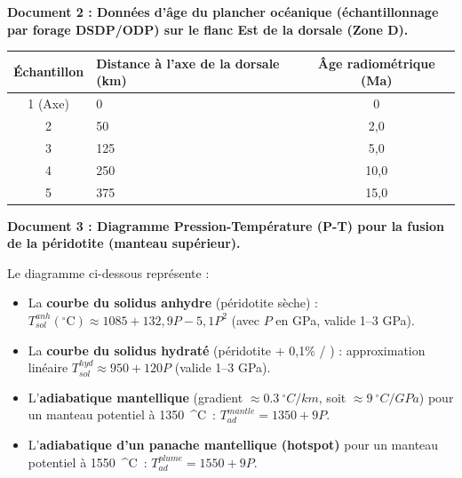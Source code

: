\documentclass[11pt]{article}
\begin{document}
\par
\textbf{Document 2 : Données d'âge du plancher océanique (échantillonnage par forage DSDP/ODP) sur le flanc Est de la dorsale (Zone D).}
\begin{center}
\begin{tabularx}{\linewidth}{|c|X|c|}\hline
\textbf{Échantillon} & \textbf{Distance à l'axe de la dorsale (km)} & \textbf{Âge radiométrique (Ma)} \\ \hline
1 (Axe) & 0 & 0 \\ \hline
2 & 50 & 2,0 \\ \hline
3 & 125 & 5,0 \\ \hline
4 & 250 & 10,0 \\ \hline
5 & 375 & 15,0 \\ \hline
\end{tabularx}
\end{center}

\par
\textbf{Document 3 : Diagramme Pression-Température (P-T) pour la fusion de la péridotite (manteau supérieur).}
\par
Le diagramme ci-dessous représente :
\begin{itemize}
    \item La \textbf{courbe du solidus anhydre} (péridotite sèche) : $T_{sol}^{anh} (^\circ\mathrm{C}) \approx 1085 + 132,9 P - 5,1 P^2$ (avec $P$ en GPa, valide 1--3 GPa).
    \item La \textbf{courbe du solidus hydraté} (péridotite + 0,1\%  / ) : approximation linéaire $T_{sol}^{hyd} \approx 950 + 120 P$ (valide 1--3 GPa).
    \item L'\textbf{adiabatique mantellique} (gradient $\approx \SI{0,3}{^\circ C/km}$, soit $\approx \SI{9}{^\circ C/GPa}$) pour un manteau potentiel à \SI{1350}{^\circ C} : $T_{ad}^{mantle} = 1350 + 9P$.
    \item L'\textbf{adiabatique d'un panache mantellique (hotspot)} pour un manteau potentiel à \SI{1550}{^\circ C} : $T_{ad}^{plume} = 1550 + 9P$.
\end{itemize}
\end{document}
